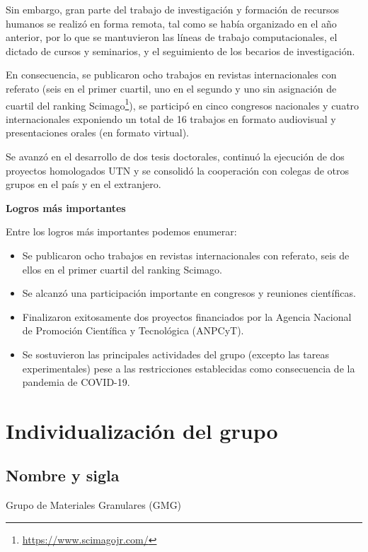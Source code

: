 \documentclass[a4paper,11pt,twoside,final,titlepage,onecolumn,openright]{report}
\begin{document}
Sin embargo, gran parte del trabajo de investigación y formación de recursos humanos se realizó en forma remota, tal como se había organizado en el año anterior, por lo que se mantuvieron las líneas de trabajo computacionales, el dictado de cursos y seminarios, y el seguimiento de los becarios de investigación.

En consecuencia, se publicaron ocho trabajos en revistas internacionales con referato (seis en el primer cuartil, uno en el segundo y uno sin asignación de cuartil del ranking Scimago\footnote{\href{https://www.scimagojr.com/}{https://www.scimagojr.com/}}), se participó en cinco congresos nacionales y cuatro internacionales exponiendo un total de 16 trabajos en formato audiovisual y presentaciones orales (en formato virtual).

Se avanzó en el desarrollo de dos tesis doctorales, continuó la ejecución de dos proyectos homologados UTN y se consolidó la cooperación con colegas de otros grupos en el país y en el extranjero.
\vspace{0.5cm}

{\bf Logros más importantes}

Entre los logros más importantes podemos enumerar:

\begin{itemize}
\item Se publicaron ocho trabajos en revistas internacionales con referato, seis de ellos en el primer cuartil del ranking Scimago.
\item Se alcanzó una participación importante en congresos y reuniones científicas.
\item Finalizaron exitosamente dos proyectos financiados por la Agencia Nacional de Promoción Científica y Tecnológica (ANPCyT).
\item Se sostuvieron las principales actividades del grupo (excepto las tareas experimentales) pese a las restricciones establecidas como consecuencia de la pandemia de COVID-19.
\end{itemize}


\section{Individualización del grupo}

\subsection{Nombre y sigla}
 Grupo de Materiales Granulares (GMG)
\end{document}
